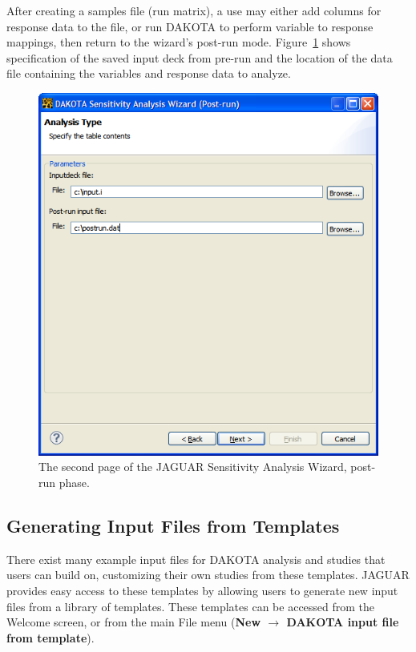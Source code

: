 After creating a samples file (run matrix), a use may either add
columns for response data to the file, or run DAKOTA to perform
variable to response mappings, then return to the wizard's post-run
mode.  Figure~\ref{fig:input:jaguar_sa_post_run} shows specification
of the saved input deck from pre-run and the location of the data file
containing the variables and response data to analyze.
\begin{figure}
  \centering
  \includegraphics[scale=0.5]{images/jaguar_sa_post_run}
  \caption{The second page of the JAGUAR Sensitivity Analysis Wizard,
  post-run phase.}
  \label{fig:input:jaguar_sa_post_run}
\end{figure}

\subsection{Generating Input Files from Templates}

There exist many example input files for DAKOTA analysis and studies
that users can build on, customizing their own studies from these
templates.  JAGUAR provides easy access to these templates by allowing
users to generate new input files from a library of templates.  These
templates can be accessed from the Welcome screen, or from the main
File menu ({\bf New $\rightarrow$ DAKOTA input file from template}).

